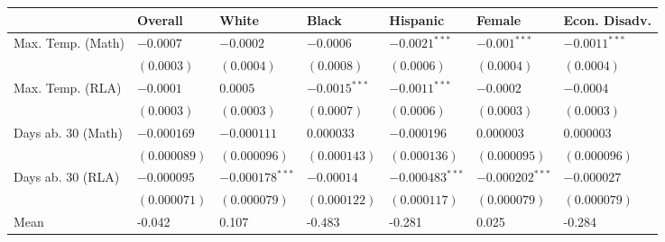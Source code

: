 
\begin{tabular}{lllllll}
\toprule
  & Overall & White & Black & Hispanic & Female & Econ. Disadv.\\
\midrule
Max. Temp. (Math) & $-0.0007$ & $-0.0002$ & $-0.0006$ & $-0.0021^{***}$ & $-0.001^{***}$ & $-0.0011^{***}$\\
 & $(0.0003)$ & $(0.0004)$ & $(0.0008)$ & $(0.0006)$ & $(0.0004)$ & $(0.0004)$\\
\addlinespace
Max. Temp. (RLA) & $-0.0001$ & $0.0005$ & $-0.0015^{***}$ & $-0.0011^{***}$ & $-0.0002$ & $-0.0004$\\
 & $(0.0003)$ & $(0.0003)$ & $(0.0007)$ & $(0.0006)$ & $(0.0003)$ & $(0.0003)$\\
\addlinespace
Days ab. 30 (Math) & $-0.000169$ & $-0.000111$ & $0.000033$ & $-0.000196$ & $0.000003$ & $0.000003$\\
 & $(0.000089)$ & $(0.000096)$ & $(0.000143)$ & $(0.000136)$ & $(0.000095)$ & $(0.000096)$\\
\addlinespace
Days ab. 30 (RLA) & $-0.000095$ & $-0.000178^{***}$ & $-0.00014$ & $-0.000483^{***}$ & $-0.000202^{***}$ & $-0.000027$\\
 & $(0.000071)$ & $(0.000079)$ & $(0.000122)$ & $(0.000117)$ & $(0.000079)$ & $(0.000079)$\\
\addlinespace
\midrule
Mean & -0.042 & 0.107 & -0.483 & -0.281 & 0.025 & -0.284\\
\bottomrule
\end{tabular}
